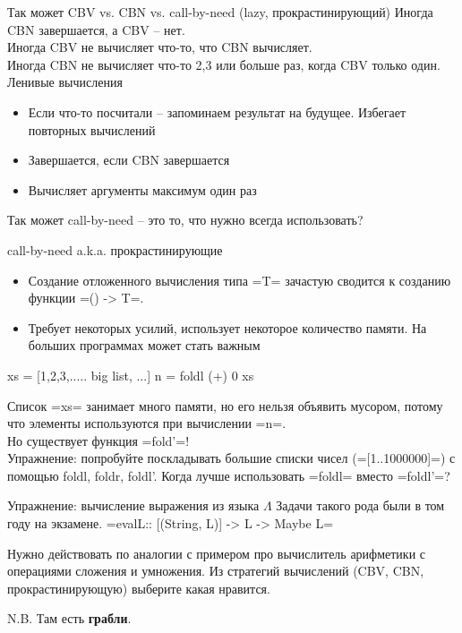 \documentclass[
  xcolor={svgnames},
  hyperref={colorlinks,citecolor=DeepPink4,linkcolor=DarkRed,urlcolor=DarkBlue}]{beamer}
\begin{document}
\begin{frame}[fragile]{Так может CBV vs. CBN vs. call-by-need (lazy, прокрастинирующий)}
Иногда CBN завершается, а CBV -- нет.\\
Иногда CBV не вычисляет что-то, что CBN вычисляет.\\
Иногда CBN не вычисляет что-то 2,3 или больше раз, когда CBV только один.\\
\vspace{1cm}
Ленивые вычисления
\begin{itemize}
 \item Если что-то посчитали -- запоминаем результат на будущее. Избегает повторных вычислений
 \item Завершается, если CBN завершается
 \item Вычисляет аргументы максимум один раз
\end{itemize}
{\Large \faQuestion} Так может call-by-need -- это то, что нужно всегда использовать?
\end{frame}

\begin{frame}[fragile]{call-by-need a.k.a. прокрастинирующие}
\begin{itemize}
  \item Создание отложенного вычисления типа \hsinline=T= зачастую сводится к созданию функции \hsinline=() -> T=.
  \item Требует некоторых усилий, использует некоторое количество памяти. На больших программах может стать важным
\end{itemize}
\begin{verbnobox}[\monacoB]
 xs = [1,2,3,..... big list, ...]
 n = foldl (+) 0 xs
\end{verbnobox}
\pause
Список \hsinline=xs= занимает много памяти, но его нельзя объявить мусором, потому что элементы используются при вычислении \hsinline=n=.\pause\\
\vspace{0.5cm}
Но существует функция \hsinline=fold'=!\\

Упражнение: попробуйте поскладывать большие списки чисел (\hsinline=[1..1000000]=) с помощью foldl, foldr, foldl'. Когда лучше использовать \hsinline=foldl= вместо \hsinline=foldl'=?
\end{frame}

\begin{frame}[fragile]{Упражнение: вычисление выражения из языка $\Lambda$}
Задачи такого рода были в том году на экзамене.
\vspace{1cm}
\hsinline=evalL:: [(String, L)] -> L -> Maybe L=

Нужно действовать по аналогии с примером про вычислитель арифметики с операциями сложения и умножения. Из стратегий вычислений (CBV, CBN, прокрастинирующую) выберите какая нравится.

N.B. Там есть \textbf{грабли}.
\end{frame}
\end{document}
